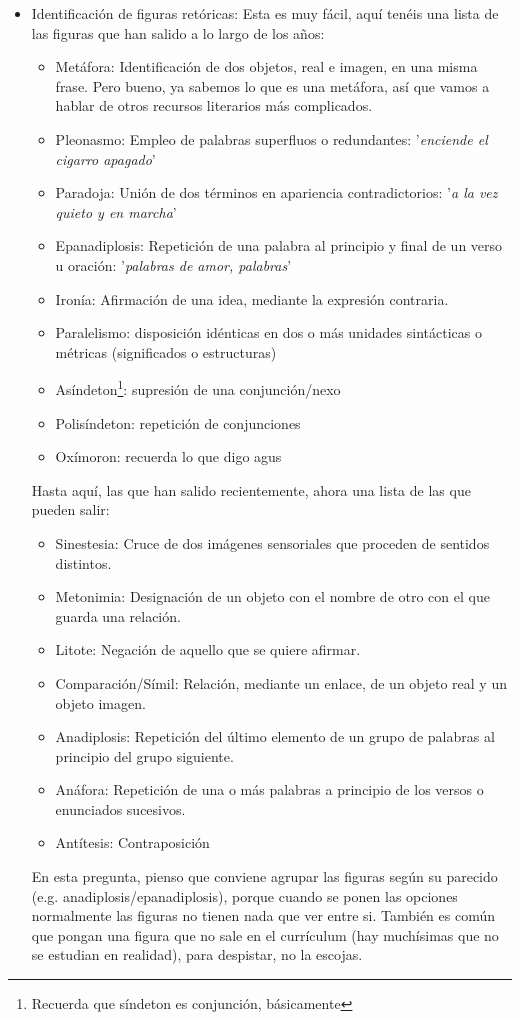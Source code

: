\documentclass[arial,a4paper,print]{article}
\begin{document}
\begin{itemize}
\item Identificación de figuras retóricas: Esta es muy fácil, aquí tenéis una lista de las figuras que han salido a lo largo de los años: 
\begin{itemize}
	\item Metáfora: Identificación de dos objetos, real e imagen, en una misma frase. Pero bueno, ya sabemos lo que es una metáfora, así que vamos a hablar de otros recursos literarios más complicados.
	\item Pleonasmo: Empleo de palabras superfluos o redundantes: '\textit{enciende el cigarro apagado}'
	\item Paradoja:  Unión de dos términos en apariencia contradictorios: '\textit{a la vez quieto y en marcha}'
	\item Epanadiplosis: Repetición de una palabra al principio y final de un verso u oración: '\textit{palabras de amor, palabras}' 
	\item Ironía: Afirmación de una idea, mediante la expresión contraria. 
	\item Paralelismo: disposición idénticas en dos o más unidades sintácticas o métricas (significados o estructuras)
	\item Asíndeton\footnote{Recuerda que síndeton es conjunción, básicamente}: supresión de una conjunción/nexo
	\item Polisíndeton: repetición de conjunciones
	\item Oxímoron: recuerda lo que digo agus
\end{itemize}

Hasta aquí, las que han salido recientemente, ahora una lista de las que pueden salir:
\begin{itemize}
	\item Sinestesia: Cruce de dos imágenes sensoriales que proceden de sentidos distintos. 
	\item Metonimia: Designación de un objeto con el nombre de otro con el que guarda una relación. 
	\item Litote: Negación de aquello que se quiere afirmar. 
	\item Comparación/Símil: Relación, mediante un enlace, de un objeto real y un objeto imagen. 
	\item Anadiplosis: Repetición del último elemento de un grupo de palabras al principio del grupo siguiente.
	\item Anáfora: Repetición de una o más palabras a principio de los versos o enunciados sucesivos.
	\item Antítesis: Contraposición
\end{itemize}
En esta pregunta, pienso que conviene agrupar las figuras según su parecido (e.g. anadiplosis/epanadiplosis), porque cuando se ponen las opciones normalmente las figuras no tienen nada que ver entre si. También es común que pongan una figura que no sale en el currículum (hay muchísimas que no se estudian en realidad), para despistar, no la escojas. 


\end{itemize}
\end{document}
